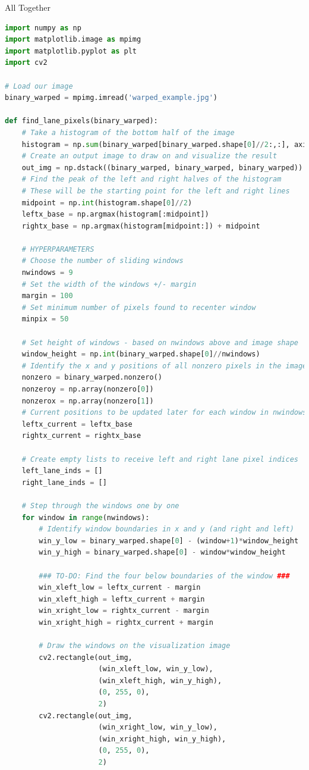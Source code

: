 \documentclass[12pt]{article}
\begin{document}
All Together
\begin{lstlisting}[language=Python]
import numpy as np
import matplotlib.image as mpimg
import matplotlib.pyplot as plt
import cv2

# Load our image
binary_warped = mpimg.imread('warped_example.jpg')

def find_lane_pixels(binary_warped):
    # Take a histogram of the bottom half of the image
    histogram = np.sum(binary_warped[binary_warped.shape[0]//2:,:], axis=0)
    # Create an output image to draw on and visualize the result
    out_img = np.dstack((binary_warped, binary_warped, binary_warped))
    # Find the peak of the left and right halves of the histogram
    # These will be the starting point for the left and right lines
    midpoint = np.int(histogram.shape[0]//2)
    leftx_base = np.argmax(histogram[:midpoint])
    rightx_base = np.argmax(histogram[midpoint:]) + midpoint

    # HYPERPARAMETERS
    # Choose the number of sliding windows
    nwindows = 9
    # Set the width of the windows +/- margin
    margin = 100
    # Set minimum number of pixels found to recenter window
    minpix = 50

    # Set height of windows - based on nwindows above and image shape
    window_height = np.int(binary_warped.shape[0]//nwindows)
    # Identify the x and y positions of all nonzero pixels in the image
    nonzero = binary_warped.nonzero()
    nonzeroy = np.array(nonzero[0])
    nonzerox = np.array(nonzero[1])
    # Current positions to be updated later for each window in nwindows
    leftx_current = leftx_base
    rightx_current = rightx_base

    # Create empty lists to receive left and right lane pixel indices
    left_lane_inds = []
    right_lane_inds = []

    # Step through the windows one by one
    for window in range(nwindows):
        # Identify window boundaries in x and y (and right and left)
        win_y_low = binary_warped.shape[0] - (window+1)*window_height
        win_y_high = binary_warped.shape[0] - window*window_height
        
        ### TO-DO: Find the four below boundaries of the window ###
        win_xleft_low = leftx_current - margin
        win_xleft_high = leftx_current + margin
        win_xright_low = rightx_current - margin
        win_xright_high = rightx_current + margin
        
        # Draw the windows on the visualization image
        cv2.rectangle(out_img,
                      (win_xleft_low, win_y_low),
                      (win_xleft_high, win_y_high),
                      (0, 255, 0), 
                      2) 
        cv2.rectangle(out_img,
                      (win_xright_low, win_y_low),
                      (win_xright_high, win_y_high),
                      (0, 255, 0), 
                      2) 
        

\end{lstlisting}
\end{document}
